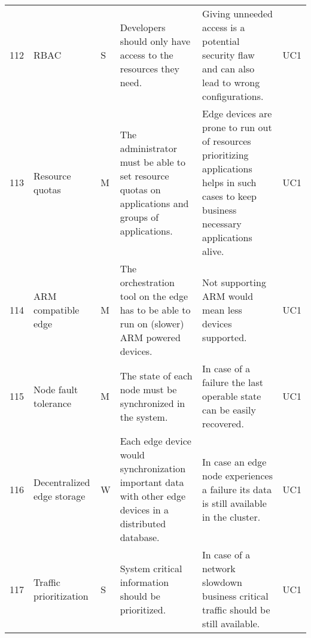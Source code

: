 \begin{longtable}{l p{2cm} p{0.8cm} p{3.6cm} p{4.5cm} p{0.8cm} }
112                     & RBAC                                    & S     & Developers should only have access to the resources they need.                                                                                                   & Giving unneeded access is a potential security flaw and can also lead to wrong configurations.                                                                                    & UC1    \\
113                     & Resource quotas                         & M     & The administrator must be able to set resource quotas on applications and groups of applications.                                                                & Edge devices are prone to run out of resources prioritizing applications helps in such cases to keep business necessary applications alive.                                       & UC1    \\
114                     & ARM compatible edge                     & M     & The orchestration tool on the edge has to be able to run on (slower) ARM powered devices.                                                                        & Not supporting ARM would mean less devices supported.                                                                                                                             & UC1    \\
115                     & Node fault tolerance                    & M     & The state of each node must be synchronized in the system.                                                                                                       & In case of a failure the last operable state can be easily recovered.                                                                                                             & UC1    \\
116                     & Decentralized edge storage              & W     & Each edge device would synchronization important data with other edge devices in a distributed database.                                                         & In case an edge node experiences a failure its data is still available in the cluster.                                                                                            & UC1    \\
117                     & Traffic prioritization                  & S     & System critical information should be prioritized.                                                                                                               & In case of a network slowdown business critical traffic should be still available.                                                                                                & UC1    \\

\end{longtable}
